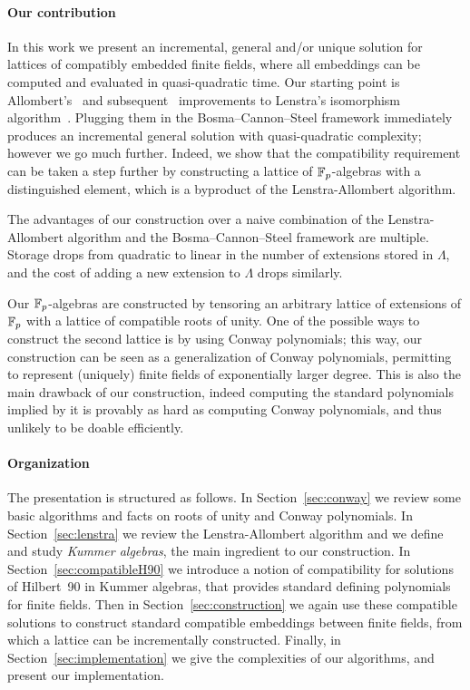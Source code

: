 \documentclass[sigconf]{acmart}
\begin{document}
\paragraph{Our contribution}
In this work we present an incremental, general and/or unique solution
for lattices of compatibly embedded finite fields, where all
embeddings can be computed and evaluated in quasi-quadratic time. %
Our starting point is Allombert's~\cite{Allombert02} and
subsequent~\cite{brieulle2018computing} improvements to Lenstra's
isomorphism algorithm~\cite{LenstraJr91}. %
Plugging them in the Bosma--Cannon--Steel framework immediately produces
an incremental general solution with quasi-quadratic complexity;
however we go much further. %
Indeed, we show that the compatibility requirement can be taken a step
further by constructing a lattice of $\mathbb{F}_{p}$-algebras with a
distinguished element, which is a byproduct of the Lenstra-Allombert
algorithm.

The advantages of our construction over a naive combination of the
Lenstra-Allombert algorithm and the Bosma--Cannon--Steel framework are
multiple. %
Storage drops from quadratic to linear in the number of extensions
stored in $\Lambda$, and the cost of adding a new extension to
$\Lambda$ drops similarly. %

Our $\mathbb{F}_{p}$-algebras are constructed by tensoring an arbitrary
lattice of extensions of $\mathbb{F}_{p}$ with a lattice of compatible roots
of unity. %
One of the possible ways to construct the second lattice is by using
Conway polynomials; this way, our construction can be seen as a
generalization of Conway polynomials, permitting to represent
(uniquely) finite fields of exponentially larger degree. %
This is also the main drawback of our construction, indeed computing
the standard polynomials implied by it is provably as hard as
computing Conway polynomials, and thus unlikely to be doable
efficiently.


\paragraph{Organization}
The presentation is structured as follows. %
In Section~\ref{sec:conway} we review some basic algorithms and facts
on roots of unity and Conway polynomials. %
In Section~\ref{sec:lenstra} we review the Lenstra-Allombert algorithm
and we define and study \emph{Kummer algebras}, the main ingredient to
our construction. %
In Section~\ref{sec:compatibleH90} we introduce a notion of
compatibility for solutions of Hilbert~90 in Kummer algebras, that
provides standard defining polynomials for finite fields.  Then in
Section~\ref{sec:construction} we again use these compatible solutions
to construct standard compatible embeddings between finite fields,
from which a lattice can be incrementally constructed.  Finally, in
Section~\ref{sec:implementation} we give the complexities of our
algorithms, and present our implementation.
\end{document}
